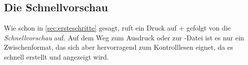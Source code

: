 %
%                    
%
%
%
%


\subsection{Die Schnellvorschau}

Wie schon in \ref{sec:ersteschritte} gesagt, ruft ein Druck auf
+ gefolgt von  die
\emph{Schnellvorschau} auf.  Auf dem Weg zum Ausdruck oder zur \PDF-Datei ist
es nur ein Zwischenformat, das sich aber hervorragend zum Kontrolllesen eignet,
da es schnell erstellt und angezeigt wird.


